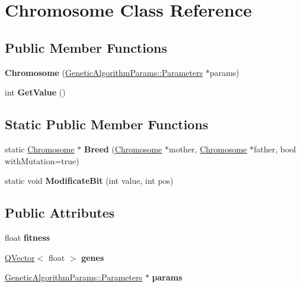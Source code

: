 \hypertarget{class_chromosome}{}\section{Chromosome Class Reference}
\label{class_chromosome}
\subsection*{Public Member Functions}
\begin{DoxyCompactItemize}
\item 
\mbox{\label{class_chromosome_a61b3ad7248489642452df6c6c24bf580}} 
{\bfseries Chromosome} (\hyperlink{struct_genetic_algorithm_params_1_1_parameters}{Genetic\+Algorithm\+Params\+::\+Parameters} $\ast$params)
\item 
\mbox{\label{class_chromosome_a2df6c471bc3dd1b248f93f9bccc0e483}} 
int {\bfseries Get\+Value} ()
\end{DoxyCompactItemize}
\subsection*{Static Public Member Functions}
\begin{DoxyCompactItemize}
\item 
\mbox{\label{class_chromosome_aaf9f158daad7690332a17158af82b9b3}} 
static \hyperlink{class_chromosome}{Chromosome} $\ast$ {\bfseries Breed} (\hyperlink{class_chromosome}{Chromosome} $\ast$mother, \hyperlink{class_chromosome}{Chromosome} $\ast$father, bool with\+Mutation=true)
\item 
\mbox{\label{class_chromosome_a01362e7b1547ddef9e79ce2e94d46f85}} 
static void {\bfseries Modificate\+Bit} (int value, int pos)
\end{DoxyCompactItemize}
\subsection*{Public Attributes}
\begin{DoxyCompactItemize}
\item 
\mbox{\label{class_chromosome_af1e2825bfa9ca01f83610d68d7773238}} 
float {\bfseries fitness}
\item 
\mbox{\label{class_chromosome_a9802175d2f1b9e093e2cbd93fdd22de7}} 
\hyperlink{class_q_vector}{Q\+Vector}$<$ float $>$ {\bfseries genes}
\item 
\mbox{\label{class_chromosome_a3e23041223b3fdcf0758f67c41b8d346}} 
\hyperlink{struct_genetic_algorithm_params_1_1_parameters}{Genetic\+Algorithm\+Params\+::\+Parameters} $\ast$ {\bfseries params}
\end{DoxyCompactItemize}


